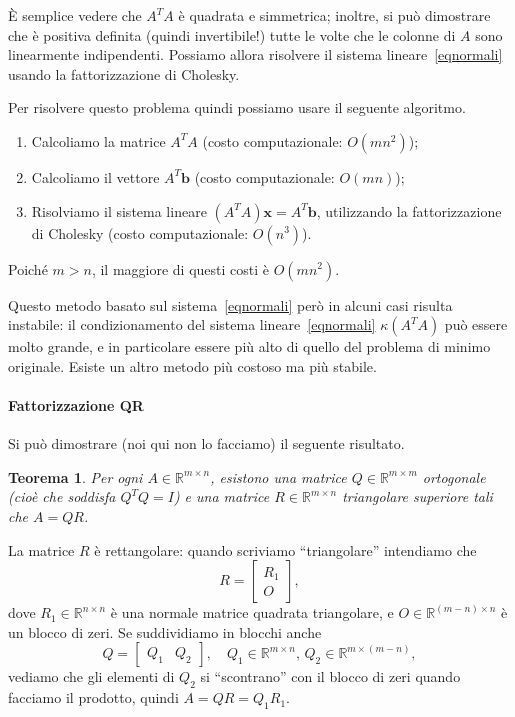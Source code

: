 \documentclass[a4paper]{report}
\newtheorem{theorem}{Teorema}[chapter]
\theoremstyle{definiton}
\theoremstyle{remark}
\newcommand{\x}{\mathbf{x}}
\renewcommand{\b}{\mathbf{b}}
\begin{document}
È semplice vedere che $A^T A$ è quadrata e simmetrica; inoltre, si può dimostrare che è positiva definita (quindi invertibile!) tutte le volte che le colonne di $A$ sono linearmente indipendenti. Possiamo allora risolvere il sistema lineare~\eqref{eqnormali} usando la fattorizzazione di Cholesky. 

Per risolvere questo problema quindi possiamo usare il seguente algoritmo.
\begin{enumerate}
    \item Calcoliamo la matrice $A^TA$ (costo computazionale: $O(mn^2)$);
    \item Calcoliamo il vettore $A^T \b$ (costo computazionale: $O(mn)$);
    \item Risolviamo il sistema lineare $(A^TA)\x = A^T\b$, utilizzando la fattorizzazione di Cholesky (costo computazionale: $O(n^3)$).
\end{enumerate}
Poiché $m>n$, il maggiore di questi costi è $O(mn^2)$.

Questo metodo basato sul sistema~\eqref{eqnormali} però in alcuni casi risulta instabile: il condizionamento del sistema lineare~\eqref{eqnormali} $\kappa(A^TA)$ può essere molto grande, e in particolare essere più alto di quello del problema di minimo originale. Esiste un altro metodo più costoso ma più stabile.

\paragraph{Fattorizzazione QR}

Si può dimostrare (noi qui non lo facciamo) il seguente risultato.
\begin{theorem}
    Per ogni $A \in \mathbb{R}^{m\times n}$, esistono una matrice $Q\in\mathbb{R}^{m\times m}$ \emph{ortogonale} (cioè che soddisfa $Q^TQ=I$) e una matrice $R \in \mathbb{R}^{m\times n}$ triangolare superiore tali che $A = QR$.
\end{theorem}
La matrice $R$ è rettangolare: quando scriviamo ``triangolare'' intendiamo che
\[
R = \begin{bmatrix}
    R_1\\ O
\end{bmatrix},
\]
dove $R_1 \in \mathbb{R}^{n\times n}$ è una normale matrice quadrata triangolare, e $O\in\mathbb{R}^{(m-n)\times n}$ è un blocco di zeri. Se suddividiamo in blocchi anche
\[
Q = \begin{bmatrix}
    Q_1 & Q_2
\end{bmatrix}, \quad Q_1 \in \mathbb{R}^{m\times n}, \, Q_2 \in \mathbb{R}^{m\times (m-n)},
\]
vediamo che gli elementi di $Q_2$ si ``scontrano'' con il blocco di zeri quando facciamo il prodotto, quindi $A = QR = Q_1 R_1$.
\end{document}
